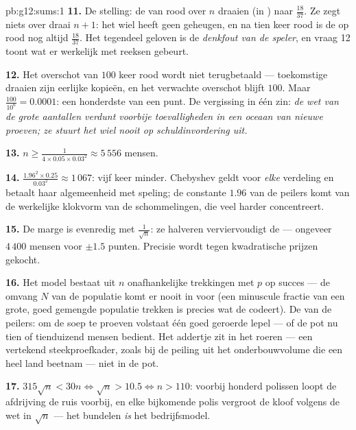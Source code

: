 \begin{solution}{pb:g12:sums:1}
\textbf{11.} De stelling: de \emph{} van rood over $n$ draaien
 (in ) naar $\frac{18}{37}$. Ze zegt niets over draai $n + 1$:
het wiel heeft geen geheugen, en na tien keer rood is de  op rood nog
altijd $\frac{18}{37}$. Het tegendeel geloven is de \emph{denkfout van de
speler}, en vraag 12 toont wat er werkelijk met reeksen gebeurt.

\textbf{12.} Het overschot van $100$ keer rood wordt niet terugbetaald ---
toekomstige draaien zijn eerlijke kopieën, en het verwachte overschot blijft
$100$. Maar $\frac{100}{10^6} = 0.0001$: een honderdste van een punt. De
vergissing in één zin: \emph{de wet van de grote aantallen verdunt voorbije
toevalligheden in een oceaan van nieuwe proeven; ze stuurt het wiel nooit op
schuldinvordering uit.}

\textbf{13.} $n \geq \frac{1}{4 \times 0.05 \times 0.03^2} \approx 5\,556$
mensen.

\textbf{14.} $\frac{1.96^2 \times 0.25}{0.03^2} \approx 1\,067$: vijf keer
minder. Chebyshev geldt voor \emph{elke} verdeling en betaalt haar
algemeenheid met speling; de constante $1.96$ van de peilers komt van de
werkelijke klokvorm van de schommelingen, die veel harder concentreert.

\textbf{15.} De marge is evenredig met $\frac{1}{\sqrt n}$: ze halveren
verviervoudigt de  --- ongeveer $4\,400$ mensen voor $\pm 1.5$
punten. Precisie wordt tegen kwadratische prijzen gekocht.

\textbf{16.} Het model bestaat uit $n$ onafhankelijke trekkingen met  $p$
op succes --- de omvang $N$ van de populatie komt er nooit in voor (een
minuscule fractie van een grote, goed gemengde populatie trekken is precies
wat de  codeert). De  van de peilers: om de soep
te proeven volstaat één goed geroerde lepel --- of de pot nu tien of
tienduizend mensen bedient. Het addertje zit in het roeren --- een vertekend
steekproefkader, zoals bij de peiling uit het onderbouwvolume die een heel
land beetnam --- niet in de pot.

\textbf{17.} $315\sqrt n < 30n \iff \sqrt n > 10.5 \iff n > 110$: voorbij
honderd polissen loopt de afdrijving de ruis voorbij, en elke bijkomende polis
vergroot de kloof volgens de wet in $\sqrt n$ --- het bundelen \emph{is} het
bedrijfsmodel.


\end{solution}
